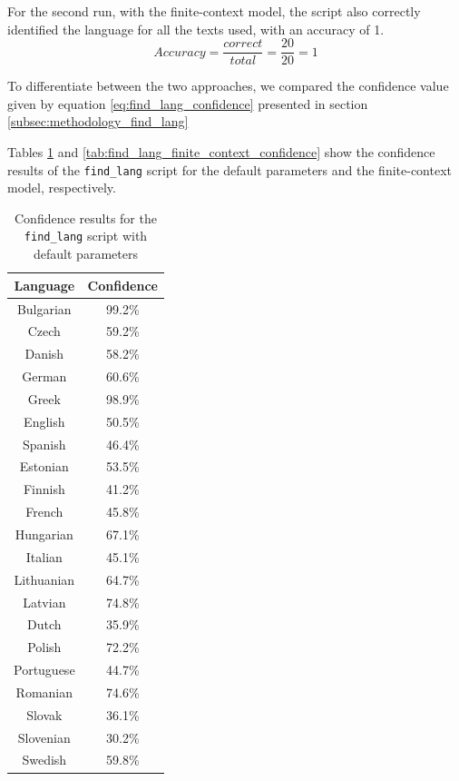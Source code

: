 \documentclass{article}
\begin{document}
For the second run, with the finite-context model, the script also correctly identified the language for all the texts used, with an accuracy of 1.
\begin{equation}
    \label{eq:find_lang_finite_context_accuracy}
    Accuracy = \frac{correct}{total} = \frac{20}{20} = 1
\end{equation}

To differentiate between the two approaches, we compared the confidence value given by equation \ref{eq:find_lang_confidence} presented in section \ref{subsec:methodology_find_lang}

Tables \ref{tab:find_lang_default_confidence} and \ref{tab:find_lang_finite_context_confidence} show the confidence results of the \texttt{find_lang} script for the default parameters and the finite-context model, respectively.

\begin{table}
    \centering
    \begin{tabular}{|c|c|}
        \hline
        Language & Confidence \\
        \hline
        Bulgarian & 99.2\% \\
        Czech & 59.2\% \\
        Danish & 58.2\% \\
        German & 60.6\% \\
        Greek & 98.9\% \\
        English & 50.5\% \\
        Spanish & 46.4\% \\
        Estonian & 53.5\% \\
        Finnish & 41.2\% \\
        French & 45.8\% \\
        Hungarian & 67.1\% \\
        Italian & 45.1\% \\
        Lithuanian & 64.7\% \\
        Latvian & 74.8\% \\
        Dutch & 35.9\% \\
        Polish & 72.2\% \\
        Portuguese & 44.7\% \\
        Romanian & 74.6\% \\
        Slovak & 36.1\% \\
        Slovenian & 30.2\% \\
        Swedish & 59.8\% \\
        \hline
    \end{tabular}
    \caption{Confidence results for the \texttt{find\_lang} script with default parameters}
    \label{tab:find_lang_default_confidence}
\end{table}
\end{document}
